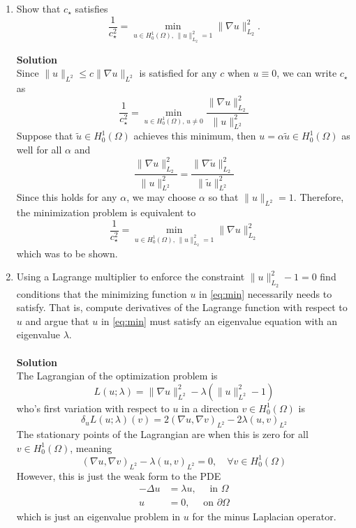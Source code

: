 \documentclass[11pt]{article}
\begin{document}
\begin{enumerate}
\begin{enumerate}




  \item Show that $c_\star$ satisfies
    \begin{equation}\label{eq:min}
      \frac{1}{c^2_\star} = \min_{u\in H_0^1(\Omega),\, \|u
        \|^2_{L_2}=1} \|\nabla u\|^2_{L_2}. 
    \end{equation}

{\bf Solution}\\
Since $\|u\|_{L^2} \le c\|\nabla u\|_{L^2}$ is satisfied for any $c$ when $u\equiv 0$, we can write $c_{\star}$ as
\[
\frac{1}{c_{\star}^2} =  \min_{u\in H_0^1(\Omega),\, u
        \neq 0} \frac{\|\nabla u\|^2_{L_2}}{\|u\|_{L^2}^2}
\]
Suppose that $\tilde{u} \in H_0^1(\Omega)$ achieves this minimum, then $u = \alpha \tilde{u} \in H_0^1(\Omega)$ as well for all $\alpha$ and
\[
 \frac{\|\nabla u\|^2_{L_2}}{\|u\|_{L^2}^2} =  \frac{\|\nabla \tilde{u} \|^2_{L_2}}{\|\tilde{u} \|_{L^2}^2}
\]
Since this holds for any $\alpha$, we may choose $\alpha$ so that $\|u\|_{L^2} = 1$.  Therefore, the minimization problem is equivalent to
\[
 \frac{1}{c^2_\star} = \min_{u\in H_0^1(\Omega),\, \|u
        \|^2_{L_2}=1} \|\nabla u\|^2_{L_2}
\]
which was to be shown.


  \item Using a Lagrange multiplier to enforce the constraint
    $\|u\|^2_{L_2} - 1 = 0$ find conditions that the minimizing
    function $u$ in \eqref{eq:min} necessarily needs to satisfy. That
    is, compute derivatives of the Lagrange function with respect to
    $u$ and argue that $u$ in \eqref{eq:min} must satisfy an
    eigenvalue equation with an eigenvalue $\lambda$.\\
\\

{\bf Solution}\\
The Lagrangian of the optimization problem is
\[
L(u;\lambda) = \|\nabla u\|_{L^2}^2 - \lambda \left( \|u\|_{L^2}^2 - 1\right)
\]
who's first variation with respect to $u$ in a direction $v\in H_0^1(\Omega)$ is
\[
\delta_u L(u;\lambda)(v) = 2 (\nabla u, \nabla v)_{L^2} - 2\lambda (u,v)_{L^2}
\]
The stationary points of the Lagrangian are when this is zero for all $v\in H_0^1(\Omega)$, meaning
\[
(\nabla u,\nabla v)_{L^2} - \lambda (u,v)_{L^2} = 0, \quad \forall v\in H_0^1(\Omega)
\]
However, this is just the weak form to the PDE
\begin{align*}
-\Delta u &= \lambda u, \quad \text{ in } \Omega\\
u &= 0, \quad \text{ on } \partial \Omega
\end{align*}
which is just an eigenvalue problem in $u$ for the minus Laplacian operator.



\end{enumerate}
\end{enumerate}
\end{document}
